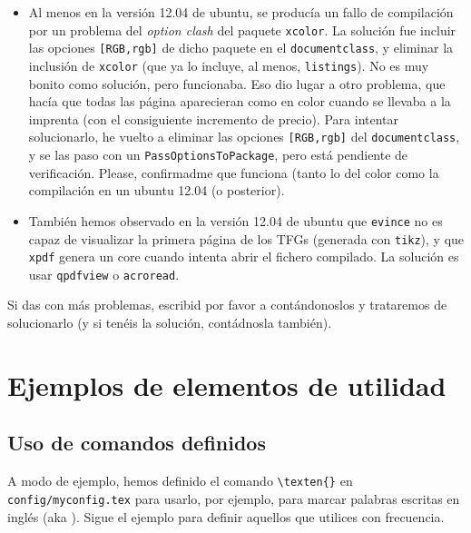 \begin{itemize}

\item Al menos en la versión 12.04 de ubuntu, se producía un fallo de
  compilación por un problema del \textit{option clash} del paquete
  \texttt{xcolor}. La solución fue incluir las opciones
  \texttt{[RGB,rgb]} de dicho paquete en el \texttt{documentclass}, y
  eliminar la inclusión de \texttt{xcolor} (que ya lo incluye, al menos,
  \texttt{listings}). No es muy bonito como solución, pero
  funcionaba. Eso dio lugar a otro problema, que hacía que todas las
  página aparecieran como en color cuando se llevaba a la imprenta (con
  el consiguiente incremento de precio). Para intentar solucionarlo, he
  vuelto a eliminar las opciones \texttt{[RGB,rgb]} del
  \texttt{documentclass}, y se las paso con un
  \texttt{PassOptionsToPackage}, pero está pendiente de
  verificación. Please, confirmadme que funciona (tanto lo del color
  como la compilación en un ubuntu 12.04 (o posterior).

\item También hemos observado en la versión 12.04 de ubuntu que
  \texttt{evince} no es capaz de visualizar la primera página de los
  TFGs (generada con \texttt{tikz}), y que \texttt{xpdf} genera un core
  cuando intenta abrir el fichero compilado. La solución es usar
  \texttt{qpdfview} o \texttt{acroread}. 

\end{itemize}

Si das con más problemas, escribid por favor a \contactauthor
contándonoslos y trataremos de solucionarlo (y si tenéis la solución,
contádnosla también).


\section{Ejemplos de elementos de utilidad}
\label{sec:ejempl-de-elem}

\subsection{Uso de comandos definidos}
\label{sec:uso-de-comandos}

A modo de ejemplo, hemos definido el comando
\texttt{\textbackslash{}texten\{\}} en \texttt{config/myconfig.tex} para
usarlo, por ejemplo, para marcar palabras escritas en inglés (aka
). Sigue el ejemplo para definir aquellos que utilices
con frecuencia.

